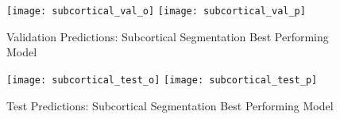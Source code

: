 \begin{figure}[H]
\centering
\texttt{[image: subcortical\_val\_o]}
\texttt{[image: subcortical\_val\_p]}
\caption{Validation Predictions: Subcortical Segmentation Best Performing Model}
\label{fig:pred-val-sub}
\end{figure}

\begin{figure}[H]
\centering
\texttt{[image: subcortical\_test\_o]}
\texttt{[image: subcortical\_test\_p]}
\caption{Test Predictions: Subcortical Segmentation Best Performing Model}
\label{fig:pred-tes-sub}
\end{figure}


